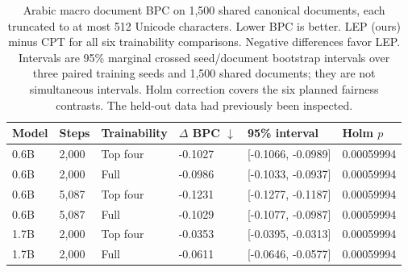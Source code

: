 \begin{table}[t]
\centering
\small
\setlength{\tabcolsep}{4pt}
\begin{tabular}{@{}llllll@{}}
\toprule
Model & Steps & Trainability & $\Delta$ BPC $\downarrow$ & 95\% interval & Holm $p$ \\
\midrule
0.6B & 2,000 & Top four & -0.1027 & [-0.1066, -0.0989] & 0.00059994 \\
0.6B & 2,000 & Full & -0.0986 & [-0.1033, -0.0937] & 0.00059994 \\
0.6B & 5,087 & Top four & -0.1231 & [-0.1277, -0.1187] & 0.00059994 \\
0.6B & 5,087 & Full & -0.1029 & [-0.1077, -0.0987] & 0.00059994 \\
1.7B & 2,000 & Top four & -0.0353 & [-0.0395, -0.0313] & 0.00059994 \\
1.7B & 2,000 & Full & -0.0611 & [-0.0646, -0.0577] & 0.00059994 \\
\bottomrule
\end{tabular}
\caption{Arabic macro document BPC on 1,500 shared canonical documents, each truncated to at most 512 Unicode characters. Lower BPC is better. LEP (ours) minus CPT for all six trainability comparisons. Negative differences favor LEP. Intervals are 95\% marginal crossed seed/document bootstrap intervals over three paired training seeds and 1,500 shared documents; they are not simultaneous intervals. Holm correction covers the six planned fairness contrasts. The held-out data had previously been inspected. }
\label{tab:rebuttal-fair-inference}
\end{table}
